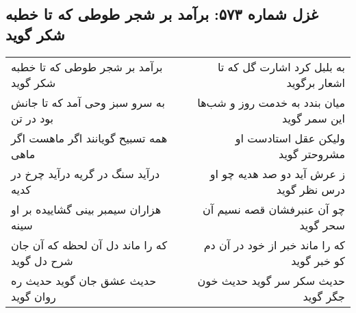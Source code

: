 \begin{center}
\section*{غزل شماره ۵۷۳: برآمد بر شجر طوطی که تا خطبه شکر گوید}
\label{sec:0573}
\begin{longtable}{l p{0.5cm} r}
برآمد بر شجر طوطی که تا خطبه شکر گوید
&&
به بلبل کرد اشارت گل که تا اشعار برگوید
\\
به سرو سبز وحی آمد که تا جانش بود در تن
&&
میان بندد به خدمت روز و شب‌ها این سمر گوید
\\
همه تسبیح گویانند اگر ماهست اگر ماهی
&&
ولیکن عقل استادست او مشروحتر گوید
\\
درآید سنگ در گریه درآید چرخ در کدیه
&&
ز عرش آید دو صد هدیه چو او درس نظر گوید
\\
هزاران سیمبر بینی گشاییده بر او سینه
&&
چو آن عنبرفشان قصه نسیم آن سحر گوید
\\
که را ماند دل آن لحظه که آن جان شرح دل گوید
&&
که را ماند خبر از خود در آن دم کو خبر گوید
\\
حدیث عشق جان گوید حدیث ره روان گوید
&&
حدیث سکر سر گوید حدیث خون جگر گوید
\\
\end{longtable}
\end{center}
